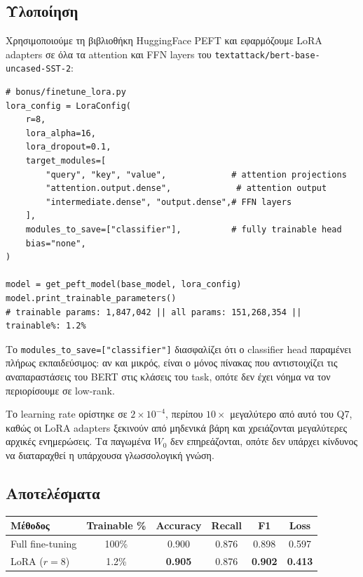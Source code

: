 \documentclass[12pt]{article}
\begin{document}
\subsection{Υλοποίηση}

Χρησιμοποιούμε τη βιβλιοθήκη HuggingFace PEFT και εφαρμόζουμε
LoRA adapters σε όλα τα attention και FFN layers του
\texttt{textattack/bert-base-uncased-SST-2}:

\begin{lstlisting}
# bonus/finetune_lora.py
lora_config = LoraConfig(
    r=8,
    lora_alpha=16,
    lora_dropout=0.1,
    target_modules=[
        "query", "key", "value",             # attention projections
        "attention.output.dense",             # attention output
        "intermediate.dense", "output.dense",# FFN layers
    ],
    modules_to_save=["classifier"],          # fully trainable head
    bias="none",
)

model = get_peft_model(base_model, lora_config)
model.print_trainable_parameters()
# trainable params: 1,847,042 || all params: 151,268,354 || trainable%: 1.2%
\end{lstlisting}

Το \texttt{modules\_to\_save=["classifier"]} διασφαλίζει ότι
ο classifier head παραμένει πλήρως εκπαιδεύσιμος: αν και μικρός,
είναι ο μόνος πίνακας που αντιστοιχίζει τις αναπαραστάσεις του
BERT στις κλάσεις του task, οπότε δεν έχει νόημα να τον
περιορίσουμε σε low-rank.

Το learning rate ορίστηκε σε $2 \times 10^{-4}$, περίπου $10\times$
μεγαλύτερο από αυτό του Q7, καθώς οι LoRA adapters ξεκινούν από
μηδενικά βάρη και χρειάζονται μεγαλύτερες αρχικές ενημερώσεις.
Τα παγωμένα $W_0$ δεν επηρεάζονται, οπότε δεν υπάρχει κίνδυνος
να διαταραχθεί η υπάρχουσα γλωσσολογική γνώση.

\subsection{Αποτελέσματα}

\begin{center}
\begin{tabular}{lccccc}
\toprule
Μέθοδος & Trainable \% & Accuracy & Recall & F1 & Loss \\
\midrule
Full fine-tuning & 100\% & 0.900 & 0.876 & 0.898 & 0.597 \\
LoRA ($r = 8$) & 1.2\% & \textbf{0.905} & 0.876 & \textbf{0.902} & \textbf{0.413} \\
\bottomrule
\end{tabular}
\end{center}
\end{document}
